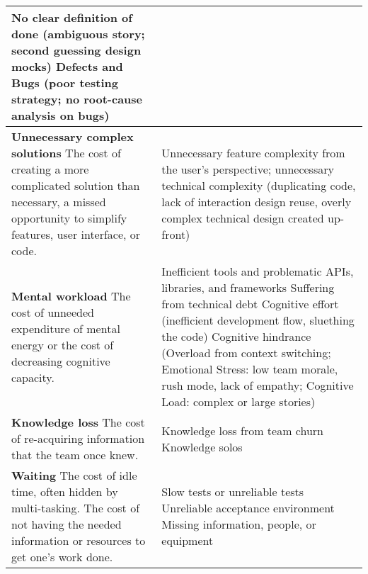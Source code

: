 \begin{table*}[htbp]
\begin{tabular}{|p{2.5in}|p{3.6in}|}
No clear definition of done (ambiguous story; second guessing design mocks) \newline
Defects and Bugs (poor testing strategy; no root-cause analysis on bugs)                                                                    \\ \hline
\textbf{Unnecessary complex solutions} \newline 
The cost of creating a more complicated solution than necessary,  a missed opportunity to simplify features, user interface, or code.      & 
Unnecessary feature complexity from the user's perspective; unnecessary technical complexity (duplicating code, lack of interaction design reuse, overly complex technical design created up-front)
\\ \hline
\textbf{Mental workload} \newline 
The cost of unneeded expenditure of mental energy or the cost of decreasing cognitive capacity.   & 
Inefficient tools and problematic APIs, libraries, and frameworks \newline
Suffering from technical debt \newline						
Cognitive effort (inefficient development flow, sluething the code) \newline
Cognitive hindrance (Overload from context switching; Emotional Stress: low team morale, rush mode, lack of empathy; Cognitive Load: complex or large stories)                                                                                                                                                     \\ \hline
\textbf{Knowledge loss} \newline
The cost of re-acquiring information that the team once knew. & 
Knowledge loss from team churn \newline
Knowledge solos 
\\ \hline
\textbf{Waiting} \newline 
The cost of idle time, often hidden by multi-tasking. The cost of not having the needed information or resources to get one's work done. & Slow tests or unreliable tests \newline Unreliable acceptance environment \newline Missing information, people, or equipment                                                                                                                                                                                                                                                                            \\ \hline

\end{tabular}
\end{table*}
